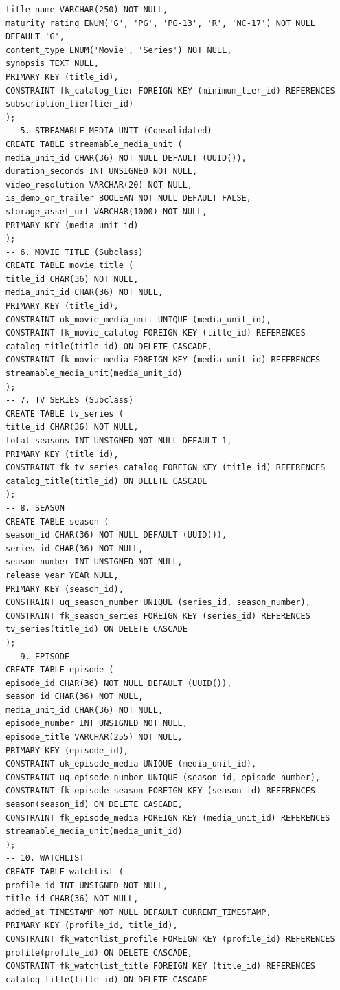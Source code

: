 \begin{lstlisting}[style=reportsql,title={Schema DDL}]
title_name VARCHAR(250) NOT NULL,
maturity_rating ENUM('G', 'PG', 'PG-13', 'R', 'NC-17') NOT NULL DEFAULT 'G',
content_type ENUM('Movie', 'Series') NOT NULL,
synopsis TEXT NULL,
PRIMARY KEY (title_id),
CONSTRAINT fk_catalog_tier FOREIGN KEY (minimum_tier_id) REFERENCES subscription_tier(tier_id)
);
-- 5. STREAMABLE MEDIA UNIT (Consolidated)
CREATE TABLE streamable_media_unit (
media_unit_id CHAR(36) NOT NULL DEFAULT (UUID()),
duration_seconds INT UNSIGNED NOT NULL,
video_resolution VARCHAR(20) NOT NULL,
is_demo_or_trailer BOOLEAN NOT NULL DEFAULT FALSE,
storage_asset_url VARCHAR(1000) NOT NULL,
PRIMARY KEY (media_unit_id)
);
-- 6. MOVIE TITLE (Subclass)
CREATE TABLE movie_title (
title_id CHAR(36) NOT NULL,
media_unit_id CHAR(36) NOT NULL,
PRIMARY KEY (title_id),
CONSTRAINT uk_movie_media_unit UNIQUE (media_unit_id),
CONSTRAINT fk_movie_catalog FOREIGN KEY (title_id) REFERENCES catalog_title(title_id) ON DELETE CASCADE,
CONSTRAINT fk_movie_media FOREIGN KEY (media_unit_id) REFERENCES streamable_media_unit(media_unit_id)
);
-- 7. TV SERIES (Subclass)
CREATE TABLE tv_series (
title_id CHAR(36) NOT NULL,
total_seasons INT UNSIGNED NOT NULL DEFAULT 1,
PRIMARY KEY (title_id),
CONSTRAINT fk_tv_series_catalog FOREIGN KEY (title_id) REFERENCES catalog_title(title_id) ON DELETE CASCADE
);
-- 8. SEASON
CREATE TABLE season (
season_id CHAR(36) NOT NULL DEFAULT (UUID()),
series_id CHAR(36) NOT NULL,
season_number INT UNSIGNED NOT NULL,
release_year YEAR NULL,
PRIMARY KEY (season_id),
CONSTRAINT uq_season_number UNIQUE (series_id, season_number),
CONSTRAINT fk_season_series FOREIGN KEY (series_id) REFERENCES tv_series(title_id) ON DELETE CASCADE
);
-- 9. EPISODE
CREATE TABLE episode (
episode_id CHAR(36) NOT NULL DEFAULT (UUID()),
season_id CHAR(36) NOT NULL,
media_unit_id CHAR(36) NOT NULL,
episode_number INT UNSIGNED NOT NULL,
episode_title VARCHAR(255) NOT NULL,
PRIMARY KEY (episode_id),
CONSTRAINT uk_episode_media UNIQUE (media_unit_id),
CONSTRAINT uq_episode_number UNIQUE (season_id, episode_number),
CONSTRAINT fk_episode_season FOREIGN KEY (season_id) REFERENCES season(season_id) ON DELETE CASCADE,
CONSTRAINT fk_episode_media FOREIGN KEY (media_unit_id) REFERENCES streamable_media_unit(media_unit_id)
);
-- 10. WATCHLIST
CREATE TABLE watchlist (
profile_id INT UNSIGNED NOT NULL,
title_id CHAR(36) NOT NULL,
added_at TIMESTAMP NOT NULL DEFAULT CURRENT_TIMESTAMP,
PRIMARY KEY (profile_id, title_id),
CONSTRAINT fk_watchlist_profile FOREIGN KEY (profile_id) REFERENCES profile(profile_id) ON DELETE CASCADE,
CONSTRAINT fk_watchlist_title FOREIGN KEY (title_id) REFERENCES catalog_title(title_id) ON DELETE CASCADE

\end{lstlisting}
